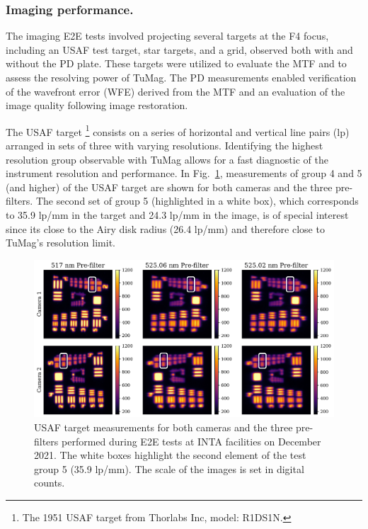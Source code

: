 \subsubsection{Imaging performance.}

The imaging E2E tests involved projecting several targets at the F4 focus, including an USAF test target, star targets, and a grid, observed both with and without the PD plate. These targets were utilized to evaluate the MTF and to assess the resolving power of TuMag. The PD measurements enabled verification of the wavefront error (WFE) derived from the MTF and an evaluation of the image quality following image restoration. 

The USAF target \footnote{The 1951 USAF target from Thorlabs Inc, model: R1DS1N.} consists on a series of horizontal and vertical line pairs (lp) arranged in sets of three with varying resolutions. Identifying the highest resolution group observable with TuMag allows for a fast diagnostic of the instrument resolution and performance. In Fig.~\ref{tumag : USAF}, measurements of group 4 and 5 (and higher) of the USAF target are shown for both cameras and the three pre-filters. The second set of group 5 (highlighted in a white box), which corresponds to 35.9 lp/mm in the target and 24.3 lp/mm in the image, is of special interest since its close to the Airy disk radius (26.4 lp/mm) and therefore close to TuMag's resolution limit. 

\begin{figure}[t]
    \includegraphics[width=\textwidth]{figures/TuMag/USAF_E2E.pdf}
    \caption[Optical E2E USAF measurements.]{
      USAF target measurements for both cameras and the three pre-filters performed during E2E tests at INTA facilities on December 2021. The white boxes highlight the second element of the test group 5 (35.9 lp/mm). The scale of the images is set in digital counts.}
      \label{tumag : USAF}
\end{figure}

